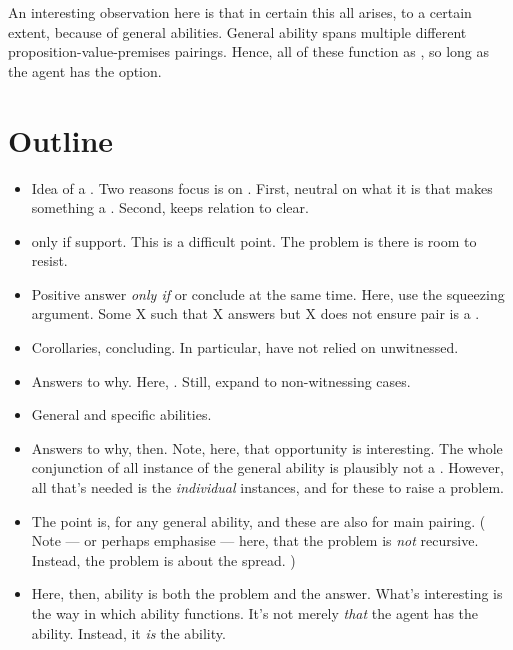 \begin{note}
  An interesting observation here is that in certain this all arises, to a certain extent, because of general abilities.
  General ability spans multiple different proposition-value-premises pairings.
  Hence, all of these function as , so long as the agent has the option.
\end{note}


\section{Outline}

\begin{note}
  \begin{itemize}
  \item
    Idea of a \fc{}.
    Two reasons focus is on \fc{}.
    First, neutral on what it is that makes something a \fc{}.
    Second, keeps relation to \qzS{} clear.
  \item
    \fc{} only if support.
    This is a difficult point.
    The problem is there is room to resist.
  \item
    Positive answer \emph{only if} \fc{} or conclude at the same time.
    Here, use the squeezing argument.
    Some X such that X answers but X does not ensure pair is a \fc{}.
  \item
    Corollaries, concluding.
    In particular, have not relied on unwitnessed.
  \item
    Answers to why.
    Here, .
    Still, expand to non-witnessing cases.
  \item
    General and specific abilities.
  \item
    Answers to why, then.
    Note, here, that opportunity is interesting.
    The whole conjunction of all instance of the general ability is plausibly not a \requ{}.
    However, all that's needed is the \emph{individual} instances, and for these to raise a problem.
  \item
    The point is,  for any general ability, and these are also  for main pairing.
    (%
    Note --- or perhaps emphasise --- here, that the problem is \emph{not} recursive.
    Instead, the problem is about the spread.%
    )
  \item
    Here, then, ability is both the problem and the answer.
    What's interesting is the way in which ability functions.
    It's not merely \emph{that} the agent has the ability.
    Instead, it \emph{is} the ability.
  \end{itemize}
\end{note}

